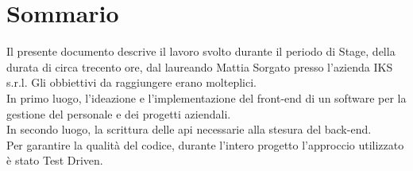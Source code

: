 
\cleardoublepage
{}
{}
\begingroup
\let\clearpage\relax
\let\cleardoublepage\relax
\let\cleardoublepage\relax

\chapter*{Sommario}

Il presente documento descrive il lavoro svolto durante il periodo di Stage, della durata di circa trecento ore, dal laureando Mattia Sorgato presso l'azienda IKS s.r.l. Gli obbiettivi da raggiungere erano molteplici.\\
In primo luogo, l'ideazione e l'implementazione del \gls{front-end} di un software per la gestione del personale e dei progetti aziendali.\\
In secondo luogo, la scrittura delle \gls{api} necessarie alla stesura del \gls{back-end}.\\
Per garantire la qualità del codice, durante l'intero progetto l'approccio utilizzato è stato Test Driven.

%
%

\endgroup			

\vfill

